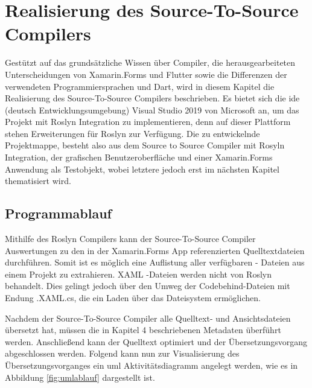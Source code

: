 \chapter{Realisierung des Source-To-Source Compilers}
\label{chap:Realisierung}
Gestützt auf das grundsätzliche Wissen über Compiler, die herausgearbeiteten Unterscheidungen von  Xamarin.Forms und Flutter sowie die Differenzen der verwendeten Programmiersprachen  \Csharp und Dart, wird in diesem Kapitel die Realisierung des Source-To-Source Compilers beschrieben.  Es bietet sich die \ac{ide} (deutsch Entwicklungsumgebung) Visual Studio 2019 von Microsoft an,  um das Projekt mit Roslyn Integration zu implementieren,  denn auf dieser Plattform stehen Erweiterungen für Roslyn zur Verfügung.
Die zu entwickelnde Projektmappe,  besteht also aus dem Source to Source Compiler mit Rosyln Integration, der grafischen Benutzeroberfläche und einer Xamarin.Forms
Anwendung als Testobjekt,  wobei letztere jedoch erst im nächsten Kapitel thematisiert wird.


\section{Programmablauf}
Mithilfe des Roslyn Compilers kann der Source-To-Source Compiler Auswertungen zu den in der Xamarin.Forms App referenzierten Quelltextdateien durchführen.  Somit ist es
möglich eine Auflistung aller verfügbaren \Csharp - Dateien aus einem Projekt zu extrahieren.  XAML -Dateien werden nicht von Roslyn behandelt.  Dies gelingt jedoch über den Umweg der Codebehind-Dateien mit Endung .XAML.cs,  die ein Laden über das Dateisystem ermöglichen. 

Nachdem der Source-To-Source Compiler alle Quelltext- und Ansichtsdateien übersetzt hat,  müssen die in Kapitel 4 beschriebenen Metadaten überführt werden.  Anschließend kann der Quelltext optimiert und der Übersetzungsvorgang abgeschlossen werden.  Folgend kann nun zur Visualisierung des Übersetzungsvorganges ein \ac{uml}  Aktivitätsdiagramm angelegt werden, wie es in Abbildung \ref{fig:umlablauf} dargestellt ist.

